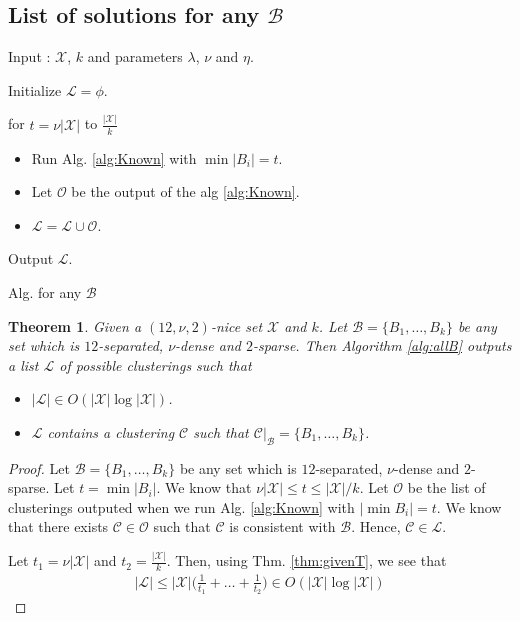 \documentclass[twoside]{article}
\newcommand{\mc}{\mathcal}
\newtheorem{theorem}{Theorem}
\newenvironment{alg}{
    \begin{list}{}{
        \setlength{\itemsep}{2pt}
        \setlength{\parsep}{0pt}
        \setlength{\parskip}{0pt}
        \setlength{\topsep}{1pt}
    }
}
{
    \end{list}
}
\begin{document}
\subsection{List of solutions for any $\mc B$}

\begin{algorithm}
\begin{alg}
\item[] Input : $\mc X$, $k$ and parameters $\lambda$, $\nu$ and $\eta$.
\item[] Initialize $\mc L = \phi$. 
\item[] for $t = \nu|\mc X|$ to $\frac{|\mc X|}{k}$ 
\begin{itemize}
\item[] Run Alg. \ref{alg:Known} with $\min |B_i| = t$.
\item[] Let $\mc O$ be the output of the alg \ref{alg:Known}.
\item[] $\mc L = \mc L \cup \mc O$.
\end{itemize}
Output $\mc L$.
\label{alg:allB}
\end{alg}
\caption{Alg. for any $\mc B$}
\end{algorithm}

\begin{theorem}
Given a $(12,\nu,2)$-nice set $\mc X$ and $k$. Let $\mc B = \{B_1,\ldots,B_k\}$ be any set which is $12$-separated, $\nu$-dense and $2$-sparse. Then Algorithm \ref{alg:allB} outputs a list $\mc L$ of possible clusterings such that
\begin{itemize}[nolistsep, noitemsep]
\item $|\mc L| \in O(|\mc X|\log |\mc X|)$. 
\item $\mc L$ contains a clustering $\mc C$ such that $\mc C|_{\mc B} = \{B_1,\ldots,B_k\}$.
\end{itemize}
\end{theorem}

\begin{proof}
Let $\mc B = \{B_1,\ldots,B_k\}$ be any set which is $12$-separated, $\nu$-dense and $2$-sparse. Let $t = \min |B_i|$. We know that $\nu |\mc X| \le t \le |\mc X|/k$. Let $\mc O$ be the list of clusterings outputed when we run Alg. \ref{alg:Known} with $|\min B_i| = t$. We know that there exists $\mc C \in \mc O$ such that $\mc C$ is consistent with $\mc B$. Hence, $\mc C \in \mc L$.

Let $t_1 = \nu |\mc X|$ and $t_2 = \frac{|\mc X|}{k}$. Then, using Thm. \ref{thm:givenT}, we see that 
\begin{align*}
	|\mc L| \le |\mc X|\Big(\frac{1}{t_1}+\ldots+\frac{1}{t_2}\Big) \in O(|\mc X|\log |\mc X|)
\end{align*}
\end{proof}
\end{document}

